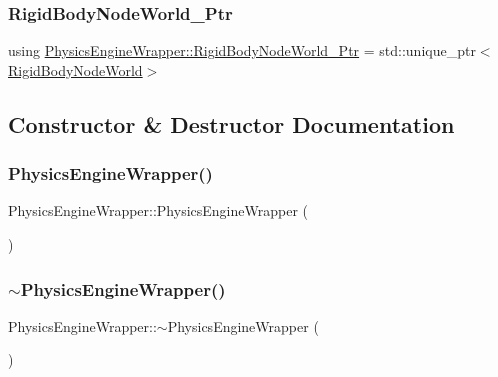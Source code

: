 \subsubsection{\texorpdfstring{Rigid\+Body\+Node\+World\+\_\+\+Ptr}{RigidBodyNodeWorld\_Ptr}}
{\footnotesize\ttfamily using \mbox{\hyperlink{class_physics_engine_wrapper_a3c72d58c14dbb32642177a6a7aa73368}{Physics\+Engine\+Wrapper\+::\+Rigid\+Body\+Node\+World\+\_\+\+Ptr}} =  std\+::unique\+\_\+ptr$<$\mbox{\hyperlink{class_rigid_body_node_world}{Rigid\+Body\+Node\+World}}$>$}



\subsection{Constructor \& Destructor Documentation}
\mbox{\label{class_physics_engine_wrapper_a9927ccae5bfa6fff5a329bcd55fdb006}} 
\subsubsection{\texorpdfstring{Physics\+Engine\+Wrapper()}{PhysicsEngineWrapper()}}
{\footnotesize\ttfamily Physics\+Engine\+Wrapper\+::\+Physics\+Engine\+Wrapper (\begin{DoxyParamCaption}{ }\end{DoxyParamCaption})\hspace{0.3cm}{\ttfamily [explicit]}}

\mbox{\label{class_physics_engine_wrapper_aa918612e647ac8e0d5510d991752096e}} 
\subsubsection{\texorpdfstring{$\sim$\+Physics\+Engine\+Wrapper()}{~PhysicsEngineWrapper()}}
{\footnotesize\ttfamily Physics\+Engine\+Wrapper\+::$\sim$\+Physics\+Engine\+Wrapper (\begin{DoxyParamCaption}{ }\end{DoxyParamCaption})\hspace{0.3cm}{\ttfamily [default]}}



